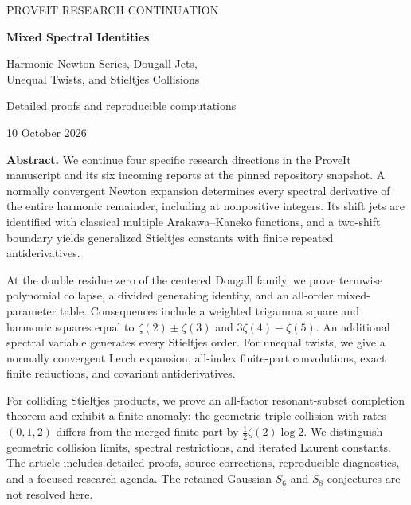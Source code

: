\documentclass[11pt,a4paper]{article}
\numberwithin{equation}{section}
\theoremstyle{definition}
\theoremstyle{remark}
\begin{document}
\hypersetup{pageanchor=false}
\begin{titlepage}
\centering
\vspace*{18mm}
{\large\color{accent}PROVEIT RESEARCH CONTINUATION\par}
\vspace{11mm}
{\LARGE\bfseries\color{ink}Mixed Spectral Identities\par}
\vspace{7mm}
{\Large Harmonic Newton Series, Dougall Jets,\\[4pt]
Unequal Twists, and Stieltjes Collisions\par}
\vspace{13mm}
{\large Detailed proofs and reproducible computations\par}
\vspace{5mm}
{10 October 2026\par}
\vspace{13mm}
\begin{minipage}{0.88\textwidth}
\textbf{Abstract.}
We continue four specific research directions in the ProveIt manuscript
and its six incoming reports at the pinned repository snapshot.
A normally convergent Newton expansion determines every spectral
derivative of the entire harmonic remainder, including at nonpositive
integers. Its shift jets are identified with classical multiple
Arakawa--Kaneko functions, and a two-shift boundary yields generalized
Stieltjes constants with finite repeated antiderivatives.

At the double residue zero of the centered Dougall family, we prove
termwise polynomial collapse, a divided generating identity, and an
all-order mixed-parameter table. Consequences include a weighted
trigamma square and harmonic squares equal to
$\zeta(2)\pm\zeta(3)$ and $3\zeta(4)-\zeta(5)$.
An additional spectral variable generates every Stieltjes order.
For unequal twists, we give a normally convergent Lerch expansion,
all-index finite-part convolutions, exact finite reductions, and
covariant antiderivatives.

For colliding Stieltjes products, we prove an all-factor
resonant-subset completion theorem and exhibit a finite anomaly:
the geometric triple collision with rates $(0,1,2)$ differs from
the merged finite part by $\tfrac12\zeta(2)\log2$.
We distinguish geometric collision limits, spectral restrictions,
and iterated Laurent constants. The article includes detailed
proofs, source corrections, reproducible diagnostics, and a focused
research agenda. The retained Gaussian $S_6$ and $S_8$ conjectures
are not resolved here.


\end{minipage}
\end{titlepage}
\end{document}
